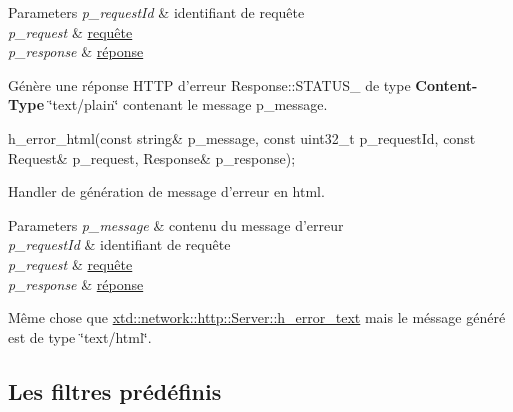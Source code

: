 \begin{DoxyItemize}
\begin{DoxyParams}{Parameters}
\hline
{\em p\-\_\-request\-Id} & identifiant de requête \\
\hline
{\em p\-\_\-request} & \hyperlink{classxtd_1_1network_1_1http_1_1Request}{requête} \\
\hline
{\em p\-\_\-response} & \hyperlink{classxtd_1_1network_1_1http_1_1Response}{réponse}\\
\hline
\end{DoxyParams}
Génère une réponse H\-T\-T\-P d'erreur Response\-::\-S\-T\-A\-T\-U\-S\-\_ de type {\bfseries Content-\/\-Type} \char`\"{}text/plain\char`\"{} contenant le message p\-\_\-message.
\item 
\begin{DoxyCode}
h\_error\_html(\textcolor{keyword}{const} \textcolor{keywordtype}{string}& p\_message, \textcolor{keyword}{const} uint32\_t p\_requestId, \textcolor{keyword}{const} Request& p\_request, Response& 
      p\_response); 
\end{DoxyCode}
 Handler de génération de message d'erreur en html. 
\begin{DoxyParams}{Parameters}
{\em p\-\_\-message} & contenu du message d'erreur \\
\hline
{\em p\-\_\-request\-Id} & identifiant de requête \\
\hline
{\em p\-\_\-request} & \hyperlink{classxtd_1_1network_1_1http_1_1Request}{requête} \\
\hline
{\em p\-\_\-response} & \hyperlink{classxtd_1_1network_1_1http_1_1Response}{réponse}\\
\hline
\end{DoxyParams}
Même chose que \hyperlink{classxtd_1_1network_1_1http_1_1Server_a39656db929894be1af465c0409c22f35}{xtd\-::network\-::http\-::\-Server\-::h\-\_\-error\-\_\-text} mais le méssage généré est de type \char`\"{}text/html\char`\"{}.
\end{DoxyItemize}

\subsection*{Les filtres prédéfinis }


